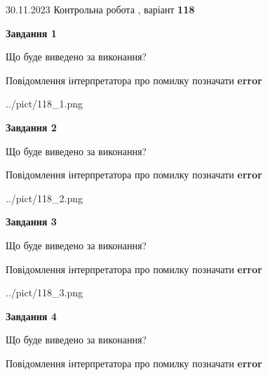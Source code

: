 \documentclass[12pt, ukrainian]{article}
\begin{document}
{{30.11.2023 Контрольна робота , варіант  \No \textbf { 118 }\par}}
{




{\begin {center}\textbf{Завдання 1}\end {center}}\par
Що буде виведено за виконання? \par
Повідомлення інтерпретатора про помилку позначати \textbf{error}

\begin{center}
	{../pict/118_1.png}
\end{center}
\newpage

{\begin {center}\textbf{Завдання 2}\end {center}}\par
Що буде виведено за виконання? \par
Повідомлення інтерпретатора про помилку позначати \textbf{error}

\begin{center}
	{../pict/118_2.png}
\end{center}
\newpage

{\begin {center}\textbf{Завдання 3}\end {center}}\par
Що буде виведено за виконання? \par
Повідомлення інтерпретатора про помилку позначати \textbf{error}

\begin{center}
	{../pict/118_3.png}
\end{center}
\newpage

{\begin {center}\textbf{Завдання 4}\end {center}}\par
Що буде виведено за виконання? \par
Повідомлення інтерпретатора про помилку позначати \textbf{error}

}
\end{document}
